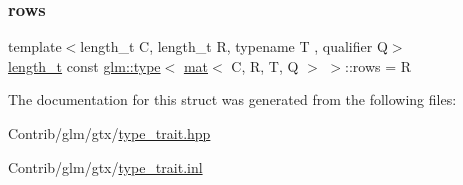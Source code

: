 \subsubsection{\texorpdfstring{rows}{rows}}
{\footnotesize\ttfamily template$<$length\+\_\+t C, length\+\_\+t R, typename T , qualifier Q$>$ \\
\mbox{\hyperlink{namespaceglm_a090a0de2260835bee80e71a702492ed9}{length\+\_\+t}} const \mbox{\hyperlink{structglm_1_1type}{glm\+::type}}$<$ \mbox{\hyperlink{structglm_1_1mat}{mat}}$<$ C, R, T, Q $>$ $>$\+::rows = R\hspace{0.3cm}{\ttfamily [static]}}



The documentation for this struct was generated from the following files\+:\begin{DoxyCompactItemize}
\item 
Contrib/glm/gtx/\mbox{\hyperlink{type__trait_8hpp}{type\+\_\+trait.\+hpp}}\item 
Contrib/glm/gtx/\mbox{\hyperlink{type__trait_8inl}{type\+\_\+trait.\+inl}}\end{DoxyCompactItemize}
